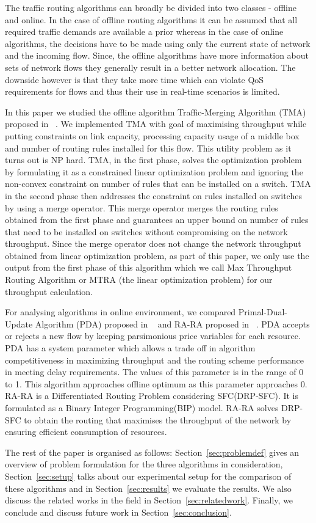 The traffic routing algorithms can broadly be divided into two classes - offline and online. In the case of offline routing algorithms it can be assumed that all required traffic demands are available a prior whereas in the case of online algorithms, the decisions have to be made using only the current state of network and the incoming flow. Since, the offline algorithms have more information about sets of network flows they generally result in a better network allocation. The downside however is that they take more time which can violate QoS requirements for flows and thus their use in real-time scenarios is limited.

In this paper we studied the offline algorithm Traffic-Merging Algorithm (TMA) proposed in ~\cite{ref:paper1}. We implemented TMA with goal of maximising throughput while putting constraints on link capacity, processing capacity usage of a middle box and number of routing rules installed for this flow. This utility problem as it turns out is NP hard. TMA, in the first phase, solves the optimization problem by formulating it as a constrained linear optimization problem and ignoring the non-convex constraint on number of rules that can be installed on a switch. TMA in the second phase then addresses the constraint on rules installed on switches by using a merge operator. This merge operator merges the routing rules obtained from the first phase and guarantees an upper bound on number of rules that need to be installed on switches without compromising on the network throughput. Since the merge operator does not change the network throughput obtained from linear optimization problem, as part of this paper, we only use the output from the first phase of this algorithm which we call Max Throughput Routing Algorithm or MTRA (the linear optimization problem) for our throughput calculation. 


For analysing algorithms in online environment, we compared Primal-Dual-Update Algorithm (PDA) proposed in ~\cite{ref:paper1} and RA-RA proposed in ~\cite{ref:paper2}. PDA accepts or rejects a new flow by keeping parsimonious price variables for each resource. PDA has a system parameter which allows a trade off in algorithm competitiveness in maximizing throughput and the routing scheme performance in meeting delay requirements. The values of this parameter is in the range of 0 to 1. This algorithm approaches offline optimum as this parameter approaches 0. RA-RA is a Differentiated Routing Problem considering SFC(DRP-SFC). It is formulated as a Binary Integer Programming(BIP) model. RA-RA solves DRP-SFC to obtain the routing that maximises the throughput of the network by ensuring efficient consumption of resources.


The rest of the paper is organised as follows: Section~\ref{sec:problemdef} gives an overview of problem formulation for the three algorithms in consideration, Section~\ref{sec:setup} talks about our experimental setup for the comparison of these algorithms and in Section~\ref{sec:results} we evaluate the results. We also discuss the related works in the field in Section~\ref{sec:relatedwork}. Finally, we conclude and discuss future work in Section~\ref{sec:conclusion}.



